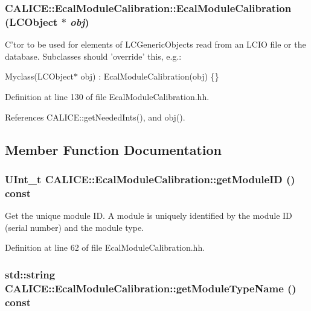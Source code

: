 \subsubsection[{EcalModuleCalibration}]{\setlength{\rightskip}{0pt plus 5cm}CALICE::EcalModuleCalibration::EcalModuleCalibration (LCObject $\ast$ {\em obj})\hspace{0.3cm}{\ttfamily  [inline]}}\label{classCALICE_1_1EcalModuleCalibration_a587b10968ad9f5222e48067f06eec062}


C'tor to be used for elements of LCGenericObjects read from an LCIO file or the database. Subclasses should 'override' this, e.g.:\par
 Myclass(LCObject$\ast$ obj) : EcalModuleCalibration(obj) \{\} \par
 

Definition at line 130 of file EcalModuleCalibration.hh.

References CALICE::getNeededInts(), and obj().

\subsection{Member Function Documentation}
\subsubsection[{getModuleID}]{\setlength{\rightskip}{0pt plus 5cm}UInt\_\-t CALICE::EcalModuleCalibration::getModuleID () const\hspace{0.3cm}{\ttfamily  [inline]}}\label{classCALICE_1_1EcalModuleCalibration_a0d5189360d04b154727560f7bd15315a}


Get the unique module ID. A module is uniquely identified by the module ID (serial number) and the module type. 

Definition at line 62 of file EcalModuleCalibration.hh.
\subsubsection[{getModuleTypeName}]{\setlength{\rightskip}{0pt plus 5cm}std::string CALICE::EcalModuleCalibration::getModuleTypeName () const\hspace{0.3cm}{\ttfamily  [inline]}}\label{classCALICE_1_1EcalModuleCalibration_aa34940889407389439940f3925f2f710}



